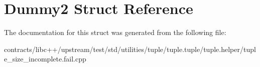\hypertarget{struct_dummy2}{}\section{Dummy2 Struct Reference}
\label{struct_dummy2}


The documentation for this struct was generated from the following file\+:\begin{DoxyCompactItemize}
\item 
contracts/libc++/upstream/test/std/utilities/tuple/tuple.\+tuple/tuple.\+helper/tuple\+\_\+size\+\_\+incomplete.\+fail.\+cpp\end{DoxyCompactItemize}
